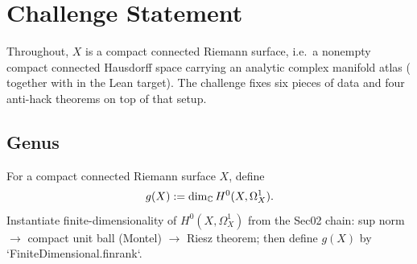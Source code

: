 %

\section{Challenge Statement}
\label{sec:challenge-statement}

Throughout, \(X\) is a compact connected Riemann surface, i.e.\ a
nonempty compact connected Hausdorff space carrying an analytic complex
manifold atlas ( together with
 in the Lean target). The challenge fixes
six pieces of data and four anti-hack theorems on top of that setup.

\subsection{Genus}

\begin{definition}
\label{def:analytic-genus}
For a compact connected Riemann surface \(X\), define
\[
  g(X) := \dim_{\mathbb{C}} H^{0}(X,\Omega^{1}_{X}).
\]
\leanok
\proofplan
Instantiate finite-dimensionality of \(H^0(X,\Omega_X^1)\) from the Sec02 chain:
sup norm \(\to\) compact unit ball (Montel) \(\to\) Riesz theorem; then define
\(g(X)\) by `FiniteDimensional.finrank`.
\end{definition}

